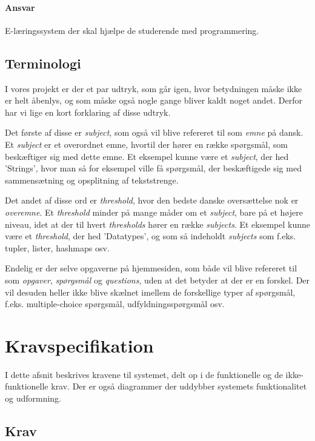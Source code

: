\documentclass[11pt, a4paper]{article}
\begin{document}
\paragraph{Ansvar}
E-læringssystem der skal hjælpe de studerende med programmering.

\subsection{Terminologi}
\label{sub:terminologi}
I vores projekt er der et par udtryk, som går igen, hvor betydningen måske ikke er helt åbenlys, og som måske også nogle gange bliver kaldt noget andet. Derfor har vi lige en kort forklaring af disse udtryk.

Det første af disse er \emph{subject}, som også vil blive refereret til som \emph{emne} på dansk. Et \emph{subject} er et overordnet emne, hvortil der hører en række spørgsmål, som beskæftiger sig med dette emne. Et eksempel kunne være et \emph{subject}, der hed 'Strings', hvor man så for eksempel ville få spørgsmål, der beskæftigede sig med sammensætning og opsplitning af tekststrenge.

Det andet af disse ord er \emph{threshold}, hvor den bedste danske oversættelse nok er \emph{overemne}. Et \emph{threshold} minder på mange måder om et \emph{subject}, bare på et højere niveau, idet at der til hvert \emph{thresholds} hører en række \emph{subjects}. Et eksempel kunne være et \emph{threshold}, der hed 'Datatypes', og som så indeholdt \emph{subjects} som f.eks. tupler, lister, hashmaps osv.

Endelig er der selve opgaverne på hjemmesiden, som både vil blive refereret til som \emph{opgaver}, \emph{spørgsmål} og \emph{questions}, uden at det betyder at der er en forskel. Der vil desuden heller ikke blive skælnet imellem de forskellige typer af spørgsmål, f.eks. multiple-choice spørgsmål, udfyldningsspørgsmål osv.

\section{Kravspecifikation}
\label{sec:kravspecifikation}
I dette afsnit beskrives kravene til systemet, delt op i de funktionelle og de ikke-funktionelle krav. Der er også diagrammer der uddybber systemets funktionalitet og udformning.

\subsection{Krav}
\label{sub:krav}
\end{document}
